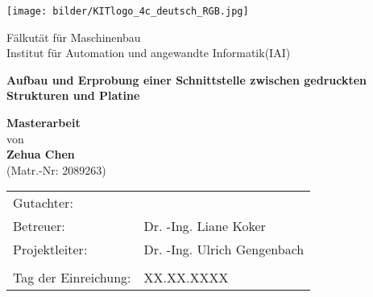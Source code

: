 \thispagestyle{empty}

\begin{center}
\texttt{[image: bilder/KITlogo\_4c\_deutsch\_RGB.jpg]}

Fälkutät für Maschinenbau\\
Institut für Automation und angewandte Informatik(IAI)\\
\vskip 3cm 

\Large 
\textbf{ \textsf{Aufbau und Erprobung einer Schnittstelle zwischen gedruckten Strukturen und Platine} } 

\normalsize
\vskip 2cm \large {\bf{Masterarbeit}}\\
von\\

{\bf Zehua Chen}\\
(Matr.-Nr: 2089263)
\\
\vfill

\sffamily


\begin{tabular}{ll}
\\
Gutachter:   & \\
Betreuer:    & Dr. -Ing. Liane Koker\\
Projektleiter:    & Dr. -Ing. Ulrich Gengenbach\\
\\
Tag der Einreichung: & XX.XX.XXXX
\end{tabular}

\vskip 2cm

\clearpage
\end{center}

